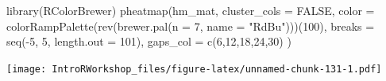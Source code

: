\documentclass[
]{book}
\newenvironment{Shaded}{\begin{snugshade}}{\end{snugshade}}
\newcommand{\AttributeTok}[1]{\textcolor[rgb]{0.77,0.63,0.00}{#1}}
\newcommand{\ConstantTok}[1]{\textcolor[rgb]{0.00,0.00,0.00}{#1}}
\newcommand{\DecValTok}[1]{\textcolor[rgb]{0.00,0.00,0.81}{#1}}
\newcommand{\FunctionTok}[1]{\textcolor[rgb]{0.00,0.00,0.00}{#1}}
\newcommand{\NormalTok}[1]{#1}
\newcommand{\SpecialCharTok}[1]{\textcolor[rgb]{0.00,0.00,0.00}{#1}}
\newcommand{\StringTok}[1]{\textcolor[rgb]{0.31,0.60,0.02}{#1}}
\begin{document}
\begin{Shaded}
\begin{Highlighting}[]
\FunctionTok{library}\NormalTok{(RColorBrewer)}
\FunctionTok{pheatmap}\NormalTok{(hm\_mat,}
         \AttributeTok{cluster\_cols =} \ConstantTok{FALSE}\NormalTok{,}
         \AttributeTok{color =} \FunctionTok{colorRampPalette}\NormalTok{(}\FunctionTok{rev}\NormalTok{(}\FunctionTok{brewer.pal}\NormalTok{(}\AttributeTok{n =} \DecValTok{7}\NormalTok{, }\AttributeTok{name =} \StringTok{"RdBu"}\NormalTok{)))(}\DecValTok{100}\NormalTok{),}
         \AttributeTok{breaks =} \FunctionTok{seq}\NormalTok{(}\SpecialCharTok{{-}}\DecValTok{5}\NormalTok{, }\DecValTok{5}\NormalTok{, }\AttributeTok{length.out =} \DecValTok{101}\NormalTok{),}
         \AttributeTok{gaps\_col =} \FunctionTok{c}\NormalTok{(}\DecValTok{6}\NormalTok{,}\DecValTok{12}\NormalTok{,}\DecValTok{18}\NormalTok{,}\DecValTok{24}\NormalTok{,}\DecValTok{30}\NormalTok{)}
\NormalTok{)}
\end{Highlighting}
\end{Shaded}

\texttt{[image: IntroRWorkshop\_files/figure-latex/unnamed-chunk-131-1.pdf]}

  
\end{document}
